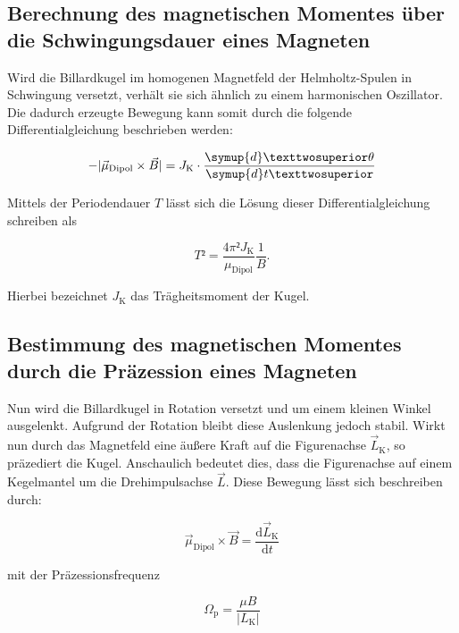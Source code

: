 \subsection{Berechnung des magnetischen Momentes über die Schwingungsdauer eines Magneten}

\noindent Wird die Billardkugel im homogenen Magnetfeld der Helmholtz-Spulen in Schwingung versetzt, verhält sie sich 
ähnlich zu einem harmonischen Oszillator. Die dadurch erzeugte Bewegung kann somit durch die folgende Differentialgleichung
beschrieben werden:

\begin{equation*}
    - | \vec{\mu}_\text{Dipol} \times \vec{B} | = J_\text{K} \cdot \frac{\symup{d}²\theta}{\symup{d}t²}
\end{equation*}

\noindent Mittels der Periodendauer $T$ lässt sich die Lösung dieser Differentialgleichung schreiben als 

\begin{equation*}
    T² = \frac{4\pi²J_\text{K}}{\mu_\text{Dipol}}\frac{1}{B}.
\end{equation*}

\noindent Hierbei bezeichnet $J_\text{K}$ das Trägheitsmoment der Kugel.

\subsection{Bestimmung des magnetischen Momentes durch die Präzession eines Magneten}

\noindent Nun wird die Billardkugel in Rotation versetzt und um einem kleinen Winkel ausgelenkt. Aufgrund 
der Rotation bleibt diese Auslenkung jedoch stabil. Wirkt nun durch das Magnetfeld eine äußere Kraft auf die 
Figurenachse $\vec{L}_\text{K}$, so präzediert die Kugel. Anschaulich bedeutet dies, dass die Figurenachse auf einem Kegelmantel 
um die Drehimpulsachse $\vec{L}$. Diese Bewegung lässt sich beschreiben durch:

\begin{equation}
    \vec{\mu}_\text{Dipol} \times \vec{B} = \frac{\text{d}\vec{L}_\text{K}}{\text{d}t}
    \label{eqn:Schwingung}
\end{equation}

\noindent mit der Präzessionsfrequenz 

\begin{equation*}
    \Omega_\text{p} = \frac{\mu B}{| L_\text{K} |}
\end{equation*}

